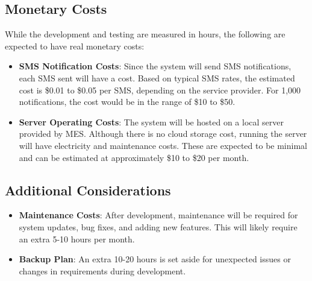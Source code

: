 \documentclass[12pt]{article}
\begin{document}
\subsection{Monetary Costs}
While the development and testing are measured in hours, the following are expected to have real monetary costs:
\begin{itemize}
    \item \textbf{SMS Notification Costs}: Since the system will send SMS notifications, each SMS sent will have a cost. Based on typical SMS rates, the estimated cost is \$0.01 to \$0.05 per SMS, depending on the service provider. For 1,000 notifications, the cost would be in the range of \$10 to \$50.
    \item \textbf{Server Operating Costs}: The system will be hosted on a local server provided by MES. Although there is no cloud storage cost, running the server will have electricity and maintenance costs. These are expected to be minimal and can be estimated at approximately \$10 to \$20 per month.
\end{itemize}

\subsection{Additional Considerations}
\begin{itemize}
    \item \textbf{Maintenance Costs}: After development, maintenance will be required for system updates, bug fixes, and adding new features. This will likely require an extra 5-10 hours per month.
    \item \textbf{Backup Plan}: An extra 10-20 hours is set aside for unexpected issues or changes in requirements during development.
\end{itemize}
\end{document}
